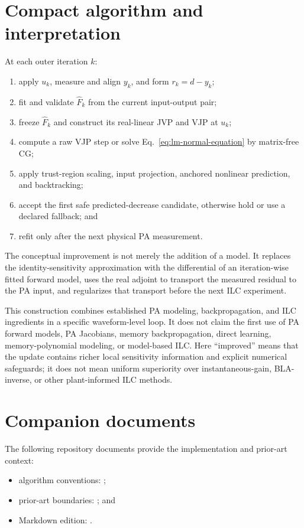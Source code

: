\documentclass[10pt,a4paper]{article}
\newcommand{\Fhat}{\widehat F}
\begin{document}
\section{Compact algorithm and interpretation}

At each outer iteration $k$:
\begin{enumerate}
  \item apply $u_k$, measure and align $y_k$, and form $r_k=d-y_k$;
  \item fit and validate $\Fhat_k$ from the current input-output pair;
  \item freeze $\Fhat_k$ and construct its real-linear JVP and VJP at $u_k$;
  \item compute a raw VJP step or solve Eq.~\eqref{eq:lm-normal-equation} by matrix-free CG;
  \item apply trust-region scaling, input projection, anchored nonlinear prediction, and backtracking;
  \item accept the first safe predicted-decrease candidate, otherwise hold or use a declared fallback; and
  \item refit only after the next physical PA measurement.
\end{enumerate}

The conceptual improvement is not merely the addition of a model. It replaces the identity-sensitivity
approximation with the differential of an iteration-wise fitted forward model, uses the real adjoint to
transport the measured residual to the PA input, and regularizes that transport before the next ILC experiment.

This construction combines established PA modeling, backpropagation, and ILC ingredients in a specific
waveform-level loop. It does not claim the first use of PA forward models, PA Jacobians, memory
backpropagation, direct learning, memory-polynomial modeling, or model-based ILC. Here ``improved'' means
that the update contains richer local sensitivity information and explicit numerical safeguards; it does not
mean uniform superiority over instantaneous-gain, BLA-inverse, or other plant-informed ILC methods.

\section*{Companion documents}

The following repository documents provide the implementation and prior-art context:
\begin{itemize}
  \item algorithm conventions: ;
  \item prior-art boundaries: ; and
  \item Markdown edition: .
\end{itemize}
\end{document}
